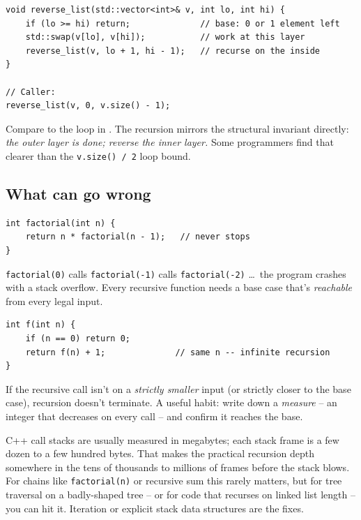 \documentclass[11pt]{article}
\begin{document}
\begin{examplebox}
\begin{verbatim}
void reverse_list(std::vector<int>& v, int lo, int hi) {
    if (lo >= hi) return;              // base: 0 or 1 element left
    std::swap(v[lo], v[hi]);           // work at this layer
    reverse_list(v, lo + 1, hi - 1);   // recurse on the inside
}

// Caller:
reverse_list(v, 0, v.size() - 1);
\end{verbatim}
Compare to the loop in . The recursion mirrors the
structural invariant directly: \emph{the outer layer is done; reverse
the inner layer.} Some programmers find that clearer than the
\texttt{v.size() / 2} loop bound.
\end{examplebox}

\subsection{What can go wrong}

\begin{warnbox}
\begin{verbatim}
int factorial(int n) {
    return n * factorial(n - 1);   // never stops
}
\end{verbatim}
\texttt{factorial(0)} calls \texttt{factorial(-1)} calls
\texttt{factorial(-2)} \ldots\ the program crashes with a stack
overflow. Every recursive function needs a base case that's
\emph{reachable} from every legal input.
\end{warnbox}

\begin{warnbox}
\begin{verbatim}
int f(int n) {
    if (n == 0) return 0;
    return f(n) + 1;              // same n -- infinite recursion
}
\end{verbatim}
If the recursive call isn't on a \emph{strictly smaller} input (or
strictly closer to the base case), recursion doesn't terminate. A
useful habit: write down a \emph{measure} -- an integer that decreases
on every call -- and confirm it reaches the base.
\end{warnbox}

\begin{warnbox}
C++ call stacks are usually measured in megabytes; each stack frame
is a few dozen to a few hundred bytes. That makes the practical
recursion depth somewhere in the tens of thousands to millions of
frames before the stack blows. For chains like \texttt{factorial(n)}
or recursive sum this rarely matters, but for tree traversal on a
badly-shaped tree -- or for code that recurses on linked list length
-- you can hit it. Iteration or explicit stack data structures are
the fixes.
\end{warnbox}
\end{document}
